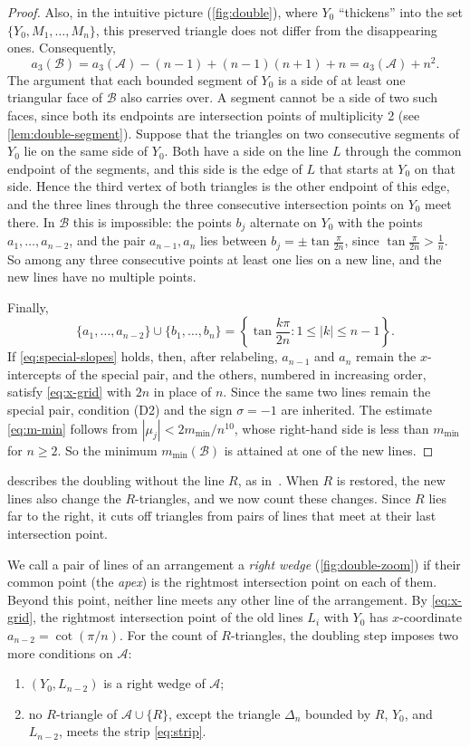 \begin{proof}
{Also, in the intuitive picture (\cref{fig:double}), where $Y_0$ ``thickens'' into the set $\{Y_0, M_1, \ldots, M_n\}$, this preserved triangle does not differ from the disappearing ones.}
Consequently,
\[
a_3(\mathcal B)
=a_3(\mathcal A)-(n-1)+(n-1)(n+1)+n
=a_3(\mathcal A)+n^2.
\]
The argument that each bounded segment of $Y_0$ is a side of at least one triangular face of $\mathcal B$ also carries over.
A segment cannot be a side of two such faces, since both its endpoints are intersection points of multiplicity 2 (see \cref{lem:double-segment}).
Suppose that the triangles on two consecutive segments of $Y_0$ lie on the same side of $Y_0$. Both have a side on the line $L$ through the common endpoint of the segments, and this side is the edge of $L$ that starts at $Y_0$ on that side. Hence the third vertex of both triangles is the other endpoint of this edge, and the three lines through the three consecutive intersection points on $Y_0$ meet there.
In $\mathcal B$ this is impossible: the points $b_j$ alternate on $Y_0$ with the points $a_1,\ldots,a_{n-2}$, and the pair $a_{n-1},a_n$ lies between $b_j=\pm\tan\frac\pi{2n}$, since $\tan\frac\pi{2n}>\frac1n$. So among any three consecutive points at least one lies on a new line, and the new lines have no multiple points.

Finally,
\[
\{a_1,\ldots,a_{n-2}\}\cup\{b_1,\ldots,b_n\}
=\left\{\tan\frac{k\pi}{2n}:1\le|k|\le n-1\right\}.
\]
If \eqref{eq:special-slopes} holds, then, after relabeling, $a_{n-1}$ and $a_n$ remain the $x$-intercepts of the special pair, and the others, numbered in increasing order, satisfy \eqref{eq:x-grid} with $2n$ in place of $n$.
Since the same two lines remain the special pair, condition (D2) and the sign $\sigma=-1$ are inherited.
The estimate \eqref{eq:m-min} follows from $|\mu_j|<2m_{\min}/n^{10}$, whose right-hand side is less than $m_{\min}$ for $n\ge2$. So the minimum $m_{\min}(\mathcal B)$ is attained at one of the new lines.
\end{proof}

 describes the doubling without the line $R$, as in~\cite{bbl}.
When $R$ is restored, the new lines also change the $R$-triangles, and we now count these changes.
Since $R$ lies far to the right, it cuts off triangles from pairs of lines that meet at their last intersection point.

We call a pair of lines of an arrangement a \emph{right wedge} (\cref{fig:double-zoom}) if their common point (the \emph{apex}) is
the rightmost intersection point on each of them. Beyond this point, neither line
meets any other line of the arrangement.
By \eqref{eq:x-grid}, the rightmost intersection point of the old lines $L_i$ with $Y_0$ has $x$-coordinate $a_{n-2}=\cot(\pi/n)$.
For the count of $R$-triangles, the doubling step imposes two more conditions on $\mathcal A$:
\begin{enumerate}[label=\textup{(W\arabic*)}]
\item $(Y_0,L_{n-2})$ is a right wedge of $\mathcal A$;
\item no $R$-triangle of $\mathcal A\cup\{R\}$, except the triangle $\Delta_n$ bounded by $R$, $Y_0$, and $L_{n-2}$, meets the strip \eqref{eq:strip}.
\end{enumerate}

